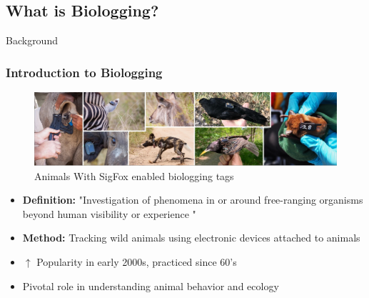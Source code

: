 \documentclass{beamer}
\begin{document}
\subsection{What is Biologging?}
\begin{frame}{Background}
  \frametitle{Introduction to Biologging}
        \begin{figure}[htbp]
          \centering
          \includegraphics[width=.75\textwidth, height=.2\textheight]{images/TrakingDevices.png}
          \caption{Animals With SigFox enabled biologging tags \cite{wild2023multi}}
          \label{fig:TaggedAnimals}
        \end{figure}
        \begin{itemize}
          \item \textbf{Definition:} "Investigation of phenomena in or around free-ranging organisms beyond human visibility or experience \cite{boyd2004bio}"
          \item \textbf{Method:} Tracking wild animals using electronic devices attached to animals
          \item $\uparrow$ Popularity in early 2000s, practiced since 60's
          \item Pivotal role in understanding animal behavior and ecology
        \end{itemize}
\end{frame}
\end{document}
